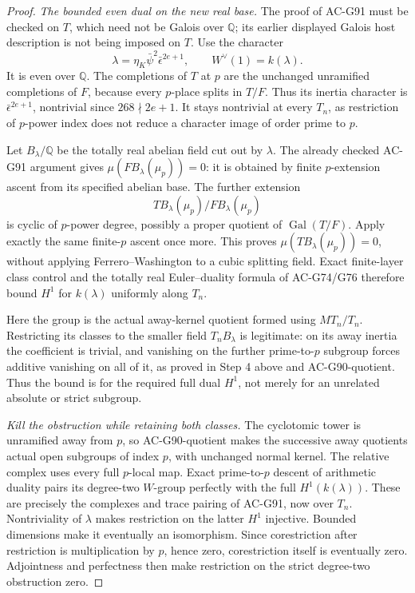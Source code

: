 \begin{proof}
\emph{The bounded even dual on the new real base.}
The proof of AC-G91 must be checked on \(T\), which need not
be Galois over \(\mathbb Q\); its earlier displayed Galois
host description is not being imposed on \(T\).
Use the character
\[
 \lambda=\eta_K\bar\psi^2\bar\epsilon^{2e+1},\qquad
 W^\vee(1)=k(\lambda).
 \tag{G93.16}
\]
It is even over \(\mathbb Q\).  The completions of \(T\) at
\(p\) are the unchanged unramified completions of \(F\),
because every \(p\)-place splits in \(T/F\).
Thus its inertia character is \(\bar\epsilon^{2e+1}\),
nontrivial since \(268\nmid2e+1\).  It stays nontrivial
at every \(T_n\), as restriction of \(p\)-power index
does not reduce a character image of order prime to \(p\).

Let \(B_\lambda/\mathbb Q\) be the totally real abelian field
cut out by \(\lambda\).  The already checked AC-G91 argument
gives \(\mu(FB_\lambda(\mu_p))=0\): it is obtained by
finite \(p\)-extension ascent from its specified abelian base.
The further extension
\[
 TB_\lambda(\mu_p)/FB_\lambda(\mu_p)
 \tag{G93.17}
\]
is cyclic of \(p\)-power degree, possibly a proper quotient
of \(\operatorname{Gal}(T/F)\).  Apply exactly the same
finite-\(p\) ascent once more.  This proves
\(\mu(TB_\lambda(\mu_p))=0\), without applying
Ferrero--Washington to a cubic splitting field.
Exact finite-layer class control and the totally real
Euler--duality formula of AC-G74/G76 therefore bound
\(H^1\) for \(k(\lambda)\) uniformly along \(T_n\).

Here the group is the actual away-kernel quotient formed
using \(MT_n/T_n\).  Restricting its classes to the smaller
field \(T_nB_\lambda\) is legitimate: on its away inertia
the coefficient is trivial, and vanishing on the further
prime-to-\(p\) subgroup forces additive vanishing on all of it,
as proved in Step 4 above and AC-G90-quotient.
Thus the bound is for the required full dual \(H^1\),
not merely for an unrelated absolute or strict subgroup.

\emph{Kill the obstruction while retaining both classes.}
The cyclotomic tower is unramified away from \(p\), so
AC-G90-quotient makes the successive away quotients actual
open subgroups of index \(p\), with unchanged normal kernel.
The relative complex uses every full \(p\)-local map.
Exact prime-to-\(p\) descent of arithmetic duality pairs its
degree-two \(W\)-group perfectly with the full
\(H^1(k(\lambda))\).  These are precisely the complexes
and trace pairing of AC-G91, now over \(T_n\).
Nontriviality of \(\lambda\) makes restriction on the latter
\(H^1\) injective.  Bounded dimensions make it eventually
an isomorphism.  Since corestriction after restriction is
multiplication by \(p\), hence zero, corestriction itself
is eventually zero.  Adjointness and perfectness then make
restriction on the strict degree-two obstruction zero.


\end{proof}
